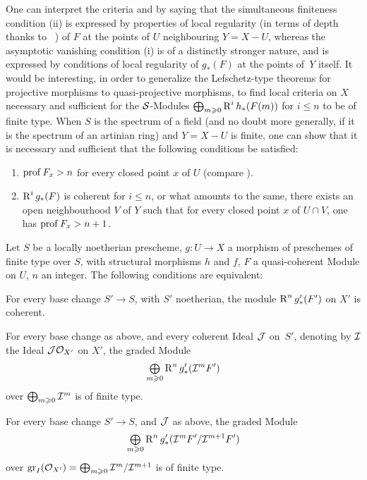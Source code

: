 \begin{remark} \label{XII.5.6}
One can interpret the criteria  and  by saying that the \og simultaneous finiteness condition\fg {} (ii) is expressed by properties of local regularity (in terms of depth thanks to ~) of $F$ at the points of $U$ neighbouring $Y=X- U$, whereas the \og asymptotic vanishing condition\fg {} (i) is of a distinctly stronger nature, and is expressed by conditions of local regularity of $g_\ast(F)$ at the points of~$Y$ itself. It would be interesting, in order to generalize the Lefschetz-type theorems for projective morphisms to quasi-projective morphisms, to find local criteria on $X$ necessary and sufficient for the ${\mathcal S}$-Modules $\bigoplus_{m\geqslant 0} \operatorname{R}^ih_\ast(F(m))$ for $i\leq n$ to be of finite type. When $S$ is the spectrum of a field (and no doubt more generally, if it is the spectrum of an artinian ring) and $Y=X- U$ is finite, one can show that it is necessary and sufficient that the following conditions be satisfied:
\begin{enumerate}
\item[\textup{1\noo)}] $\operatorname{prof} F_x >n$ for every closed point $x$ of $U$ (compare ).
\item[\textup{2\noo)}] $\operatorname{R}^ig_\ast(F)$ is coherent for $i\leq n$, or what amounts to the same, there exists an open neighbourhood $V$ of $Y$ such that for every closed point $x$ of $U\cap V$, one has $\operatorname{prof} F_x >n+1$.
\end{enumerate}
\end{remark}

\begin{proposition} \label{XII.5.7}
Let $S$ be a locally noetherian prescheme, $g:U\to X$ a morphism of preschemes of finite type over $S$, with structural morphisms $h$ and $f$, $F$ a quasi-coherent Module on $U$, $n$ an integer. The following conditions are equivalent:
\begin{enumeratei}
\item
For every base change $S'\to S$, with $S'$ noetherian, the module $\operatorname{R}^ng'_\ast(F')$ on $X'$ is coherent.
\item
For every base change as above, and every coherent Ideal ${\mathcal J}$ on~$S'$, denoting by ${\mathcal I}$ the Ideal ${\mathcal J}{\mathcal O}_{X'}$ on $X'$, the graded Module
\[
\mathop{\textstyle\bigoplus}\limits_{m\geqslant 0} \operatorname{R}^ng'_\ast({\mathcal I}^mF')
\]
over $\bigoplus_{m\geqslant 0} {\mathcal I}^m$ is of finite type.
\item
For every base change $S'\to S$, and ${\mathcal J}$ as above, the graded Module
\[
\mathop{\textstyle\bigoplus}\limits_{m\geqslant 0} \operatorname{R}^ng'_\ast({\mathcal I}^mF'/{\mathcal I}^{m+1}F')
\]
over $\operatorname{gr}_I({\mathcal O}_{X'})=\bigoplus_{m\geqslant 0} {\mathcal I}^m/{\mathcal I}^{m+1}$ is of finite type.
\end{enumeratei}
\end{proposition}

